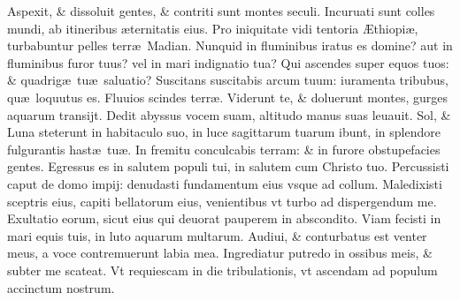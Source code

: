 \documentclass[a5paper,10pt]{book}
\def\ae{æ}
\def\AE{Æ}
\begin{document}
\begin{multicols*}{2}
\newline \color{red} A\color{black}spexit, \& dissoluit gentes, \& contriti sunt montes seculi.
\newline \color{red} I\color{black}ncuruati sunt colles mundi, ab itineribus \ae ternitatis eius.
\newline \color{red} P\color{black}ro iniquitate vidi tentoria \AE thiopi\ae , turbabuntur pelles terr\ae \ Madian.
\newline \color{red} N\color{black}unquid in fluminibus iratus es domine? aut in fluminibus furor tuus? vel in mari indignatio tua?
\newline \color{red} Q\color{black}ui ascendes super equos tuos: \& quadrig\ae \ tu\ae \ saluatio?
\newline \color{red} S\color{black}uscitans suscitabis arcum tuum: iuramenta tribubus, qu\ae \ loquutus es.
\newline \color{red} F\color{black}luuios scindes terr\ae . Viderunt te, \& doluerunt montes, gurges aquarum transijt.
\newline \color{red} D\color{black}edit abyssus vocem suam, altitudo manus suas leuauit.
\newline \color{red} S\color{black}ol, \& Luna steterunt in habitaculo suo, in luce sagittarum tuarum ibunt, in splendore fulgurantis hast\ae \ tu\ae .
\newline \color{red} I\color{black}n fremitu conculcabis terram: \& in furore obstupefacies gentes.
\newline \color{red} E\color{black}gressus es in salutem populi tui, in salutem cum Christo tuo.
\newline \color{red} P\color{black}ercussisti caput de domo impij: denudasti fundamentum eius vsque ad collum.
\newline \color{red} M\color{black}aledixisti sceptris eius, capiti bellatorum eius, venientibus vt turbo ad dispergendum me.
\newline \color{red} E\color{black}xultatio eorum, sicut eius qui deuorat pauperem in abscondito.
\newline \color{red} V\color{black}iam fecisti in mari equis tuis, in luto aquarum multarum.
\newline \color{red} A\color{black}udiui, \& conturbatus est venter meus, a voce contremuerunt labia mea.
\newline \color{red} I\color{black}ngrediatur putredo in ossibus meis, \& subter me scateat.
\newline \color{red} V\color{black}t requiescam in die tribulationis, vt ascendam ad populum accinctum nostrum.

\end{multicols*}
\end{document}
